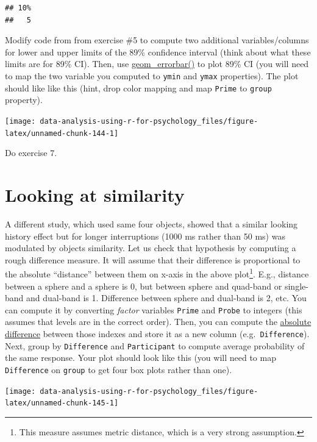 \documentclass[
]{book}
\begin{document}
\begin{verbatim}
## 10% 
##   5
\end{verbatim}

Modify code from from exercise \#5 to compute two additional variables/columns for lower and upper limits of the 89\% confidence interval (think about what these limits are for 89\% CI). Then, use \href{https://ggplot2.tidyverse.org/reference/geom_linerange.html}{geom\_errorbar()} to plot 89\% CI (you will need to map the two variable you computed to \texttt{ymin} and \texttt{ymax} properties). The plot should like like this (hint, drop color mapping and map \texttt{Prime} to \texttt{group} property).

\begin{center}\texttt{[image: data-analysis-using-r-for-psychology\_files/figure-latex/unnamed-chunk-144-1]} \end{center}

Do exercise 7.

\hypertarget{looking-at-similarity}{%
\section{Looking at similarity}\label{looking-at-similarity}}

A different study, which used same four objects, showed that a similar looking history effect but for longer interruptions (1000 ms rather than 50 ms) was modulated by objects similarity. Let us check that hypothesis by computing a rough difference measure. It will assume that their difference is proportional to the absolute ``distance'' between them on x-axis in the above plot\footnote{This measure assumes metric distance, which is a very strong assumption.}. E.g., distance between a sphere and a sphere is 0, but between sphere and quad-band or single-band and dual-band is 1. Difference between sphere and dual-band is 2, etc. You can compute it by converting \emph{factor} variables \texttt{Prime} and \texttt{Probe} to integers (this assumes that levels are in the correct order). Then, you can compute the \href{https://stat.ethz.ch/R-manual/R-devel/library/base/html/MathFun.html}{absolute difference} between those indexes and store it as a new column (e.g.~\texttt{Difference}). Next, group by \texttt{Difference} and \texttt{Participant} to compute average probability of the same response. Your plot should look like this (you will need to map \texttt{Difference} on \texttt{group} to get four box plots rather than one).

\begin{center}\texttt{[image: data-analysis-using-r-for-psychology\_files/figure-latex/unnamed-chunk-145-1]} \end{center}
\end{document}
